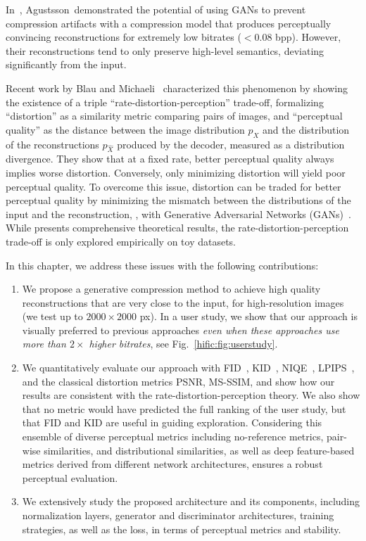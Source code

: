 In~\cite{agustsson2019extreme}, Agustsson~\etal demonstrated the potential of using GANs to prevent compression artifacts with a compression model that produces perceptually convincing reconstructions for extremely low bitrates (${<}0.08$ bpp).
However, their reconstructions tend to only preserve high-level semantics, deviating significantly from the input.

Recent work by Blau and Michaeli~\cite{blau2019rethinking} characterized this phenomenon by showing the existence of a triple ``rate-distortion-perception'' trade-off, formalizing ``distortion'' as a similarity metric comparing pairs of images, and ``perceptual quality'' as the distance between the image distribution $p_X$ and the distribution of the reconstructions $p_{\hat X}$ produced by the decoder, measured as a distribution divergence. They show that at a fixed rate, better perceptual quality always implies worse distortion. Conversely, only minimizing distortion will yield poor perceptual quality.  To overcome this issue, distortion can be traded for better perceptual quality by minimizing the mismatch between the distributions of the input and the reconstruction, \eg, with Generative Adversarial Networks (GANs)~\cite{goodfellow2014generative}. While \cite{blau2019rethinking} presents comprehensive theoretical results, the rate-distortion-perception trade-off is only explored empirically on toy datasets. 

In this chapter, we address these issues with the following contributions:
\begin{enumerate}[leftmargin=*,topsep=0pt]
    \item We propose a generative compression method to achieve high quality reconstructions that are very close to the input, for high-resolution images (we test up to $2000{\times}2000$ px). 
    In a user study, we show that our approach is visually preferred to previous approaches \emph{even when these approaches use more than $2{\times}$ higher bitrates}, see Fig.~\ref{hific:fig:userstudy}. 
    \item We quantitatively evaluate our approach with FID~\cite{heusel2017gans}, KID~\cite{binkowski2018demystifying}, NIQE~\cite{mittal2012making}, LPIPS~\cite{zhang2018unreasonable}, and the classical distortion metrics PSNR, MS-SSIM, and show how our results are consistent with the rate-distortion-perception theory. We also show that no metric would have predicted the full ranking of the user study, but that FID and KID are useful in guiding exploration.
    Considering this ensemble of diverse perceptual metrics including no-reference metrics, pair-wise similarities, and distributional similarities, as well as deep feature-based metrics derived from different network architectures, ensures a robust perceptual evaluation.
    \item We extensively study the proposed architecture and its components, including normalization layers, generator and discriminator architectures,  training strategies, as well as the loss, in terms of perceptual metrics and stability.
\end{enumerate}

